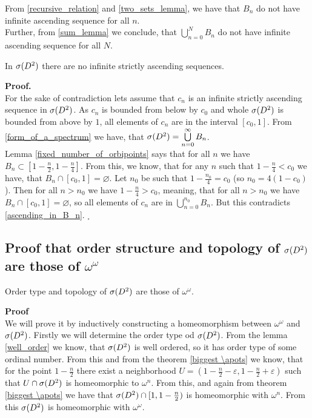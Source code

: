 \begin{observation}\label{ascending_in_B_n}
From \ref{recursive_relation} and \ref{two_sets_lemma}, we have that $B_n$ do not have 
infinite ascending sequence for all $n$. \\
Further, from \ref{sum_lemma} we conclude, 
that $\bigcup\limits_{n=0}^N B_n$ do not have infinite ascending sequence for all $N$.
\end{observation}

\begin{theorem}\label{well_order}
In ${{\sigma}(D^2)}$ there are no infinite strictly ascending sequences.
\end{theorem}
\noindent\textbf{Proof.} \\
For the sake of contradiction lets assume that $c_n$ is an infinite strictly ascending sequence in 
${{\sigma}(D^2)}$. As $c_n$ is bounded from below by $c_0$ and whole ${{\sigma}(D^2)}$ is bounded from above 
by $1$, all elements of $c_n$ are in the interval $[c_0, 1]$. 
From \ref{form_of_a_spectrum} we have, that ${{\sigma}(D^2)} = \bigcup\limits^\infty_{n=0}B_n$. \\
Lemma 
\ref{fixed_number_of_orbipoints} says that for all $n$ we
have $B_n \subset [1-\frac{n}{2}, 1 - \frac{n}{4}]$. From this, we know, that for any 
$n$ such that $1 - \frac{n}{4} < c_0$ 
we have, that $B_n \cap [c_0,1] = \varnothing $. Let $n_0$ be such that 
$1 - \frac{n_0}{4} = c_0$ (so $n_0 = 4(1-c_0)$). 
Then for all $n > n_0$ we have $1 - \frac{n}{4} > c_0$, meaning, that 
for all $n > n_0$ we have
$B_n \cap [c_0,1] = \varnothing $, so all elements of $c_n$ are in 
$\bigcup\limits_{n=0}^{n_0} B_n$.
But this contradicts \ref{ascending_in_B_n}.  $_\square$









\subsection{Proof that order structure and topology of ${{\sigma}(D^2)}$ are those of $\omega^\omega$}

\begin{theorem}\label{speD_theorem}
Order type and topology of ${{\sigma}(D^2)}$ are those of $\omega^\omega$. 
\end{theorem}

\textbf{Proof} \\
We will prove it by inductively constructing a homeomorphism between $\omega^\omega$ and ${{\sigma}(D^2)}$. 
Firstly we will determine the order type od ${{\sigma}(D^2)}$. 
From the lemma \ref{well_order} we know, that ${{\sigma}(D^2)}$ is well ordered, so it has order type 
of some ordinal number. From this and 
from the theorem \ref{biggest \apots} we know, that for the point $1-\frac{n}{2}$ there exist 
a neighborhood $U=(1-\frac{n}{2}-\varepsilon,1-\frac{n}{2}+\varepsilon)$ such that $U \cap 
{{\sigma}(D^2)}$ is homeomorphic to $\omega^n$. From this, and again from theorem \ref{biggest \apots} 
we have that ${{\sigma}(D^2)} \cap [1,1-\frac{n}{2})$ is homeomorphic with $\omega^n$. 
From this ${{\sigma}(D^2)}$ is homeomorphic with $\omega^\omega$.

